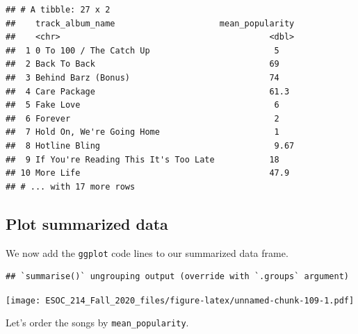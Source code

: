 \documentclass[
]{book}
\newenvironment{Shaded}{\begin{snugshade}}{\end{snugshade}}
\newcommand{\DataTypeTok}[1]{\textcolor[rgb]{0.13,0.29,0.53}{#1}}
\newcommand{\KeywordTok}[1]{\textcolor[rgb]{0.13,0.29,0.53}{\textbf{#1}}}
\newcommand{\NormalTok}[1]{#1}
\newcommand{\OperatorTok}[1]{\textcolor[rgb]{0.81,0.36,0.00}{\textbf{#1}}}
\newcommand{\StringTok}[1]{\textcolor[rgb]{0.31,0.60,0.02}{#1}}
\begin{document}
\begin{verbatim}
## # A tibble: 27 x 2
##    track_album_name                     mean_popularity
##    <chr>                                          <dbl>
##  1 0 To 100 / The Catch Up                         5   
##  2 Back To Back                                   69   
##  3 Behind Barz (Bonus)                            74   
##  4 Care Package                                   61.3 
##  5 Fake Love                                       6   
##  6 Forever                                         2   
##  7 Hold On, We're Going Home                       1   
##  8 Hotline Bling                                   9.67
##  9 If You're Reading This It's Too Late           18   
## 10 More Life                                      47.9 
## # ... with 17 more rows
\end{verbatim}

\hypertarget{plot-summarized-data}{%
\subsection{Plot summarized data}\label{plot-summarized-data}}

We now add the \texttt{ggplot} code lines to our summarized data frame.

\begin{Shaded}
\end{Shaded}

\begin{verbatim}
## `summarise()` ungrouping output (override with `.groups` argument)
\end{verbatim}

\texttt{[image: ESOC\_214\_Fall\_2020\_files/figure-latex/unnamed-chunk-109-1.pdf]}

Let's order the songs by \texttt{mean\_popularity}.

\begin{Shaded}
\end{Shaded}
\end{document}
